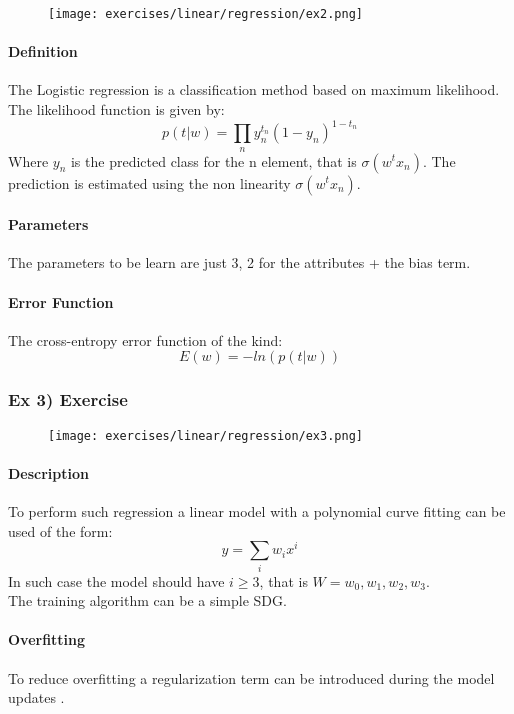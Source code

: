 \begin{figure}[H]
    \centering
    \texttt{[image: exercises/linear/regression/ex2.png]}
\end{figure}
 
 \paragraph{Definition}
The Logistic regression is a classification method based on maximum likelihood.
The likelihood function is given by:
$$p(t|w)=\prod_n y_n^{t_n}(1-y_n)^{1-t_n}$$
Where $y_n$ is the predicted class for the n element, that is $\sigma(w^tx_n)$. The prediction is estimated using the non linearity $\sigma(w^tx_n)$.

\paragraph{Parameters}
The parameters to be learn are just 3, 2 for the attributes + the bias term.

\paragraph{Error Function}
The cross-entropy error function of the kind:
$$E(w)=-ln(p(t|w))$$

\subsubsection{Ex 3) Exercise }

\begin{figure}[H]
    \centering
    \texttt{[image: exercises/linear/regression/ex3.png]}
\end{figure}

\paragraph{Description}
To perform such regression a linear model with a polynomial curve fitting can be used of the form:
$$y=\sum_i w_ix^i$$
In such case the model should have $i \ge 3$, that is $W=w_0,w_1,w_2,w_3$.\\
The training algorithm can be a simple SDG.

\paragraph{Overfitting}
To reduce overfitting a regularization term can be introduced during the model updates .


